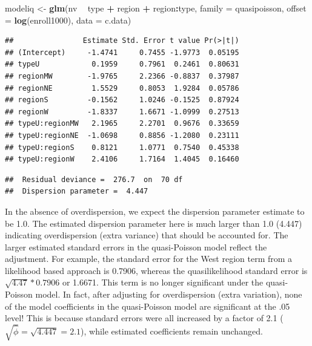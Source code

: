 \documentclass[
]{krantz}
\newenvironment{Shaded}{\begin{snugshade}}{\end{snugshade}}
\newcommand{\DataTypeTok}[1]{\textcolor[rgb]{0.27,0.27,0.27}{#1}}
\newcommand{\KeywordTok}[1]{\textcolor[rgb]{0.27,0.27,0.27}{\textbf{#1}}}
\newcommand{\NormalTok}[1]{#1}
\newcommand{\OperatorTok}[1]{\textcolor[rgb]{0.43,0.43,0.43}{\textbf{#1}}}
\newcommand{\StringTok}[1]{\textcolor[rgb]{0.5,0.5,0.5}{#1}}
\begin{document}
\begin{Shaded}
\begin{Highlighting}[]
\NormalTok{modeliq <-}\StringTok{ }\KeywordTok{glm}\NormalTok{(nv }\OperatorTok{~}\StringTok{ }\NormalTok{type }\OperatorTok{+}\StringTok{ }\NormalTok{region }\OperatorTok{+}\StringTok{ }\NormalTok{region}\OperatorTok{:}\NormalTok{type, }
               \DataTypeTok{family =}\NormalTok{ quasipoisson,}
               \DataTypeTok{offset =} \KeywordTok{log}\NormalTok{(enroll1000), }\DataTypeTok{data =}\NormalTok{ c.data)}
\end{Highlighting}
\end{Shaded}

\begin{verbatim}
##                Estimate Std. Error t value Pr(>|t|)
## (Intercept)     -1.4741     0.7455 -1.9773  0.05195
## typeU            0.1959     0.7961  0.2461  0.80631
## regionMW        -1.9765     2.2366 -0.8837  0.37987
## regionNE         1.5529     0.8053  1.9284  0.05786
## regionS         -0.1562     1.0246 -0.1525  0.87924
## regionW         -1.8337     1.6671 -1.0999  0.27513
## typeU:regionMW   2.1965     2.2701  0.9676  0.33659
## typeU:regionNE  -1.0698     0.8856 -1.2080  0.23111
## typeU:regionS    0.8121     1.0771  0.7540  0.45338
## typeU:regionW    2.4106     1.7164  1.4045  0.16460
\end{verbatim}

\begin{verbatim}
##  Residual deviance =  276.7  on  70 df 
##  Dispersion parameter =  4.447
\end{verbatim}

In the absence of overdispersion, we expect the dispersion parameter estimate to be 1.0. The estimated dispersion parameter here is much larger than 1.0 (4.447) indicating overdispersion (extra variance) that should be accounted for. The larger estimated standard errors in the quasi-Poisson model reflect the adjustment. For example, the standard error for the West region term from a likelihood based approach is 0.7906, whereas the quasilikelihood standard error is \(\sqrt{4.47}*0.7906\) or 1.6671. This term is no longer significant under the quasi-Poisson model. In fact, after adjusting for overdispersion (extra variation), none of the model coefficients in the quasi-Poisson model are significant at the .05 level! This is because standard errors were all increased by a factor of 2.1 (\(\sqrt{\hat\phi}=\sqrt{4.447}=2.1\)), while estimated coefficients remain unchanged.
\end{document}
